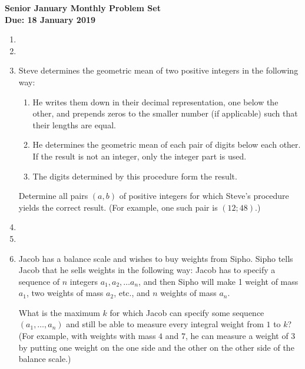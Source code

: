 \documentclass{article}
\begin{document}
\begin{center}
\textbf{\Large Senior January Monthly Problem Set}
\\ \vspace{1em}
\textbf{\large Due: 18 January 2019}
\end{center}

\begin{enumerate}[1.]

\item 


\vspace{6pt}
\item 


\vspace{6pt}
\item %
Steve determines the geometric mean of two positive integers in the following way:
\begin{enumerate}
	\item He writes them down in their decimal representation, one below the other, and prepends zeros to the smaller number (if applicable) such that their lengths are equal.
	\item He determines the geometric mean of each pair of digits below each other. If the result is not an integer, only the integer part is used.
	\item The digits determined by this procedure form the result.
\end{enumerate}
Determine all pairs $(a,b)$ of positive integers for which Steve's procedure yields the correct result. (For example, one such pair is $(12; 48)$.)


\vspace{6pt}
\item 


\vspace{6pt}
\item 


\vspace{6pt}
\item %
Jacob has a balance scale and wishes to buy weights from Sipho. Sipho tells Jacob that he sells weights in the following way: Jacob has to specify a sequence of $n$ integers $a_1, a_2, \dotsc a_n$, and then Sipho will make 1 weight of mass $a_1$, two weights of mass $a_2$, etc., and $n$ weights of mass $a_n$.

What is the maximum $k$ for which Jacob can specify some sequence $(a_1, \dotsc, a_n)$ and still be able to measure every integral weight from $1$ to $k$? (For example, with weights with mass $4$ and $7$, he can measure a weight of $3$ by putting one weight on the one side and the other on the other side of the balance scale.)



\end{enumerate}
\end{document}
